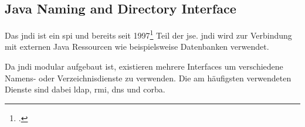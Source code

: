 
\subsection{Java Naming and Directory Interface}\label{subsec:jndi}
Das \gls{jndi} ist ein \gls{spi} und bereits seit 1997\footcite{jndiHackTricks} Teil der \gls{jse}.
\gls{jndi} wird zur Verbindung mit externen Java Ressourcen wie beispielsweise Datenbanken verwendet.

Da \gls{jndi} modular aufgebaut ist, existieren mehrere Interfaces um verschiedene Namens- oder Verzeichnisdienste zu verwenden.
Die am häufigsten verwendeten Dienste sind dabei \gls{ldap}, \gls{rmi}, \gls{dns} und \gls{corba}.
